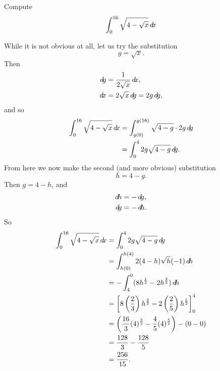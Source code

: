\documentclass{ximera}
\begin{document}
\begin{example}
Compute
\[
\int_0^{16} \sqrt{4 - \sqrt{x}} \mathop{}\!d\! x
\]
\begin{explanation}
While it is not obvious at all, let us try the substitution
\[
g = \sqrt{x}.
\]
Then
\begin{align*}
\d g &= \frac{1}{2 \sqrt{x}} \d x,\\
\d x &= 2 \sqrt{x} \d g = 2g \d g,
\end{align*}
and so
\begin{align*}
\int_0^{16} \sqrt{4 - \sqrt{x}} \mathop{}\!d\! x &= \int_{g(0)}^{g(16)} \sqrt{4-g} \cdot 2g \mathop{}\!d\! g  \\
&= \int_0^4 2g \sqrt{4-g} \mathop{}\!d\! g.
\end{align*}
From here we now make the second (and more obvious) substitution
\[
h = 4-g.
\]
Then $g = 4-h$, and
\begin{align*}
\d h &= - \d g,\\
\d g &= - \d h.
\end{align*}
So
\begin{align*}
\int_0^{16} \sqrt{4 - \sqrt{x}} \d x &= \int_0^4 2g \sqrt{4-g} \d g  \\
&= \int_{h(0)}^{h(4)} 2 (4-h) \sqrt{h} (-1) \d h  \\
&= - \int_4^0 ( 8h^{\frac{1}{2}} - 2h^{\frac{3}{2}} ) \d h  \\
&= \eval{ 8 \left( \frac{2}{3} \right) h^{\frac{3}{2}} - 2 \left( \frac{2}{5} \right) h^{\frac{5}{2}} }_{0}^{4}  \\
&= \left( \frac{16}{3} (4)^{\frac{3}{2}} - \frac{4}{5} (4)^{\frac{5}{2}} \right) - \left( 0 - 0 \right)  \\
&= \frac{128}{3} - \frac{128}{5}   \\
&= \frac{256}{15}.
\end{align*}
\end{explanation}
\end{example}
\end{document}
